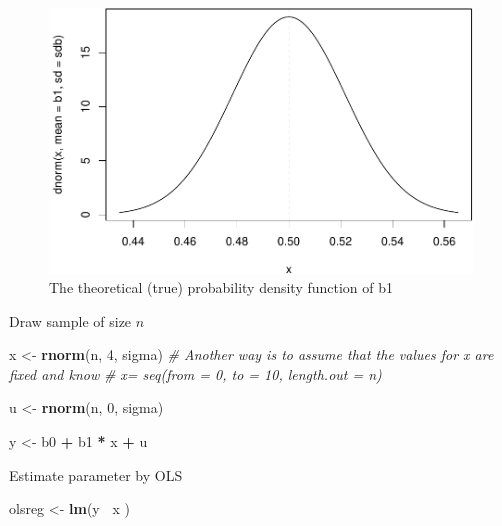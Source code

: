 \documentclass[]{book}
\newenvironment{Shaded}{\begin{snugshade}}{\end{snugshade}}
\newcommand{\CommentTok}[1]{\textcolor[rgb]{0.56,0.35,0.01}{\textit{#1}}}
\newcommand{\DecValTok}[1]{\textcolor[rgb]{0.00,0.00,0.81}{#1}}
\newcommand{\KeywordTok}[1]{\textcolor[rgb]{0.13,0.29,0.53}{\textbf{#1}}}
\newcommand{\NormalTok}[1]{#1}
\newcommand{\OperatorTok}[1]{\textcolor[rgb]{0.81,0.36,0.00}{\textbf{#1}}}
\newcommand{\StringTok}[1]{\textcolor[rgb]{0.31,0.60,0.02}{#1}}
\begin{document}
\begin{figure}

{\centering \includegraphics[width=0.8\linewidth]{MEM5220_R_files/figure-latex/fig4-1} 

}

\caption{The theoretical (true) probability density function of b1}\label{fig:fig4}
\end{figure}

Draw sample of size \(n\)

\begin{Shaded}
\begin{Highlighting}[]
\NormalTok{x <-}\StringTok{ }\KeywordTok{rnorm}\NormalTok{(n, }\DecValTok{4}\NormalTok{, sigma)}
\CommentTok{# Another way is to assume that the values for x are fixed and know}
\CommentTok{# x= seq(from = 0, to = 10, length.out = n)}
\end{Highlighting}
\end{Shaded}

\begin{Shaded}
\begin{Highlighting}[]
\NormalTok{u <-}\StringTok{ }\KeywordTok{rnorm}\NormalTok{(n, }\DecValTok{0}\NormalTok{, sigma)}
\end{Highlighting}
\end{Shaded}

\begin{Shaded}
\begin{Highlighting}[]
\NormalTok{y <-}\StringTok{ }\NormalTok{b0 }\OperatorTok{+}\StringTok{ }\NormalTok{b1 }\OperatorTok{*}\StringTok{ }\NormalTok{x }\OperatorTok{+}\StringTok{ }\NormalTok{u}
\end{Highlighting}
\end{Shaded}

Estimate parameter by OLS

\begin{Shaded}
\begin{Highlighting}[]
\NormalTok{olsreg <-}\StringTok{ }\KeywordTok{lm}\NormalTok{(y }\OperatorTok{~}\NormalTok{x )}
\end{Highlighting}
\end{Shaded}
\end{document}
